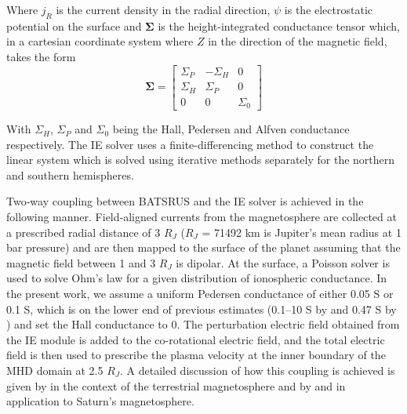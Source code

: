 Where $j_R$ is the current density in the radial direction, $\psi$ is the electrostatic potential on the surface and $\mathbf{\Sigma}$ is the height-integrated conductance tensor which, in a cartesian coordinate system where $Z$ in the direction of the magnetic field, takes the form 
\begin{equation}
    \mathbf{\Sigma} = \left[ \begin{array}{ccc}
    \Sigma_P     &-\Sigma_H   &0  \\
    \Sigma_H     &\Sigma_P   &0  \\
    0          &0        &\Sigma_0
    \end{array} \right]
\end{equation}

With $\Sigma_H$, $\Sigma_P$ and $\Sigma_0$ being the Hall, Pedersen and Alfven conductance respectively. The IE solver uses a finite-differencing method to construct the linear system which is solved using iterative methods separately for the northern and southern hemispheres.

Two‐way coupling between BATSRUS and the IE solver is achieved in the following manner. Field‐aligned currents from the magnetosphere are collected at a prescribed radial distance of 3 $R_J$ ($R_J$ = 71492 km is Jupiter's mean radius at 1 bar pressure) and are then mapped to the surface of the planet assuming that the magnetic field between 1 and 3 $R_J$ is dipolar. At the surface, a Poisson solver is used to solve Ohm's law for a given distribution of ionospheric conductance. In the present work, we assume a uniform Pedersen conductance of either 0.05 S or 0.1 S, which is on the lower end of previous estimates (0.1–10 S by  and 0.47 S by ) and set the Hall conductance to 0. The perturbation electric field obtained from the IE module is added to the co-rotational electric field, and the total electric field is then used to prescribe the plasma velocity at the inner boundary of the MHD domain at 2.5 $R_J$. A detailed discussion of how this coupling is achieved is given by  in the context of the terrestrial magnetosphere and by  and  in application to Saturn's magnetosphere.

